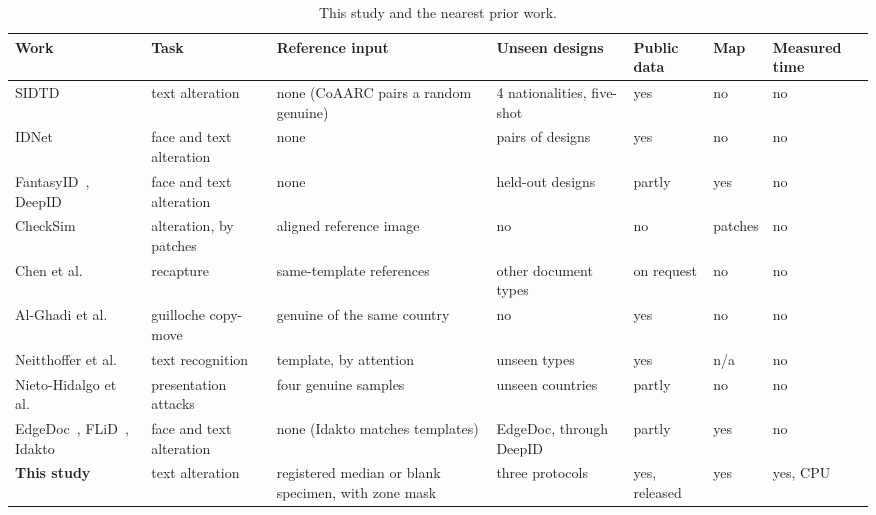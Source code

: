 \documentclass[12pt,a4paper]{article}
\begin{document}
\begin{table}[htbp]
\centering\footnotesize
\setlength{\tabcolsep}{3pt}
\renewcommand{\arraystretch}{1.1}
\caption{This study and the nearest prior work.}
\label{tab:position}
\begin{tabular}{L{2.9cm}L{2.2cm}L{2.7cm}L{2.3cm}L{1.4cm}L{1.1cm}L{1.3cm}}
\toprule
Work & Task & Reference input & Unseen designs & Public data & Map & Measured time \\
\midrule
SIDTD~\cite{boned2024sidtd} & text alteration & none (CoAARC pairs a random genuine) & 4 nationalities, five-shot & yes & no & no \\
IDNet~\cite{guan2024idnetarxiv} & face and text alteration & none & pairs of designs & yes & no & no \\
FantasyID~\cite{korshunov2025fantasyid}, DeepID~\cite{korshunov2025deepid} & face and text alteration & none & held-out designs & partly & yes & no \\
CheckSim~\cite{ghanmi2021checksim} & alteration, by patches & aligned reference image & no & no & patches & no \\
Chen et al.~\cite{chen2022domain} & recapture & same-template references & other document types & on request & no & no \\
Al-Ghadi et al.~\cite{alghadi2022guilloche,alghadi2023fmidv} & guilloche copy-move & genuine of the same country & no & yes & no & no \\
Neitthoffer et al.~\cite{neitthoffer2023knowledge} & text recognition & template, by attention & unseen types & yes & n/a & no \\
Nieto-Hidalgo et al.~\cite{nietohidalgo2026zeroshot} & presentation attacks & four genuine samples & unseen countries & partly & no & no \\
EdgeDoc~\cite{george2025edgedoc}, FLiD~\cite{flid2026}, Idakto~\cite{idakto2025embedded} & face and text alteration & none (Idakto matches templates) & EdgeDoc, through DeepID & partly & yes & no \\
\textbf{This study} & text alteration & registered median or blank specimen, with zone mask & three protocols & yes, released & yes & yes, CPU \\
\bottomrule
\end{tabular}
\end{table}

\end{document}
